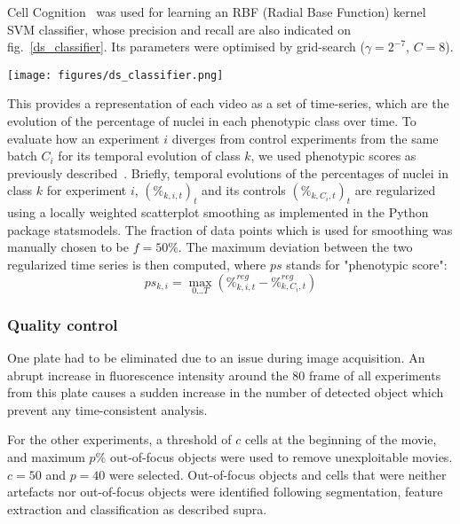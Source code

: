 Cell Cognition~\cite{cellcognition} was used for learning an RBF (Radial Base Function) kernel SVM classifier, whose precision and recall are also indicated on fig.~\ref{ds_classifier}. Its parameters were optimised by grid-search ($\gamma=2^{-7}$, $C=8$).

\begin{figure*}[ht!]
\centerline{\texttt{[image: figures/ds\_classifier.png]}}
\caption{Precision and recall per class as provided by Cell Cognition. Compared with the original classifier as published in~\cite{Walter2010}, classes \textit{ADCCM} (Asymmetric Distribution of Condensed Chromosome Masses) and \textit{Out of focus} were added. More nuclei were furthermore included for training in most classes. \textit{Shape1} (resp. \textit{Shape3}, \textit{MetaphaseAlignement}) corresponds to binucleated (resp. polylobed, metaphase alignement problem) nuclei.}
\label{ds_classifier}
\end{figure*}

This provides a representation of each video as a set of time-series, which are the evolution of the percentage of nuclei in each phenotypic class over time. To evaluate how an experiment $i$ diverges from  control experiments from the same batch $C_i$ for its temporal evolution of class $k$, we used phenotypic scores as previously described~\cite{Walter2010}. Briefly, temporal evolutions of the percentages of nuclei in class $k$ for experiment $i$, $(\%_{k,i,t})_t$ and its controls $(\%_{k,C_i,t})_t$ are regularized using a locally weighted scatterplot smoothing as implemented in the Python package statsmodels. The fraction of data points which is used for smoothing was manually chosen to be $f=50\%$. The maximum deviation between the two regularized time series is then computed, where $ps$ stands for "phenotypic score":
\[
ps_{k,i} = \max_{0\ldots T} (\%^{reg}_{k,i,t} - \%^{reg}_{k,C_i,t})
\]

\subsubsection{Quality control}
One plate had to be eliminated due to an issue during image acquisition. An abrupt increase in fluorescence intensity around the 80 frame of all experiments from this plate causes a sudden increase in the number of detected object which prevent any time-consistent analysis.

For the other experiments, a threshold of $c$ cells at the beginning of the movie, and maximum $p$\% out-of-focus objects were used to remove unexploitable movies. $c=50$ and $p=40$ were selected. Out-of-focus objects and cells that were neither artefacts nor out-of-focus objects were identified following segmentation, feature extraction and classification as described supra.

